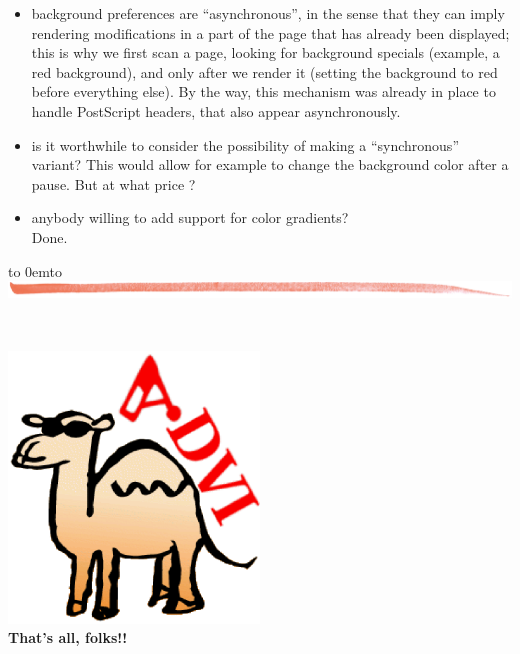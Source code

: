 \documentclass[12pt]{article}
\def\keymenu#1{\textcolor{red}{\underline{#1}}}
\def\advifooter{\vbox to 0em{\vbox to \vsize {\vfill
Press: \keymenu{n}ext page \keymenu{p}revious page
\keymenu{\textvisiblespace} next pause%
\hfill{\adviembed[sticky=advianim,width=1.56cm,height=1.824cm]{animate -geometry !g! -window !p advilogo.anim.gif}}
} \vss}}
\def\adviheader{\noindent
{\bf\Large \ActiveDVI}\\
\includegraphics[width=\textwidth]{../tex/bar.jpg.eps}}
\let \Newpage \newpage
\def \newpage {\Newpage \advifooter\adviheader}
\def\adviemptyfooter{\vbox to 0em{\vbox to \vsize {\vfill
~~\vss\advikillembed{advianim}}}}
\def\lastpage{\Newpage\adviemptyfooter\adviheader}
\begin{document}
  \begin{itemize}
    \item background preferences are ``asynchronous'', in the sense
that they can imply rendering modifications in a part of the page that
has already been displayed; this is why we first scan a page, looking
for background specials (example, a red background), and only after we
render it (setting the background to red before everything else). By
the way, this mechanism was already in place to handle PostScript
headers, that also appear asynchronously.

    \item is it worthwhile to consider the possibility of making a
``synchronous'' variant? This would allow for example to change the
background color after a pause. But at what price ?

    \item anybody willing to add support for color gradients?\\Done.
  \end{itemize}

\lastpage

~\vfill
\begin{center}
\includegraphics[width=0.5\textwidth]{../tex/advilogo.eps}\\
{\Large \bf That's all, folks!!}
\end{center}
\vfill
\end{document}
